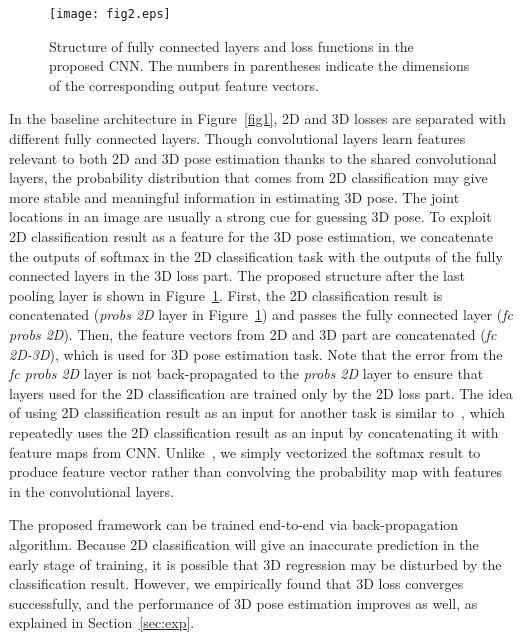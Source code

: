 \documentclass[runningheads]{llncs}
\begin{document}
\begin{figure}[t]
\centering
   \texttt{[image: fig2.eps]}
    \caption{Structure of fully connected layers and loss functions in the proposed CNN. The numbers in parentheses indicate the dimensions of the corresponding output feature vectors.}
    \label{fig2}
\end{figure}

In the baseline architecture in Figure~\ref{fig1}, 2D and 3D losses are separated with different fully connected layers. Though convolutional layers learn features relevant to both 2D and 3D pose estimation thanks to the shared convolutional layers, the probability distribution that comes from 2D classification may give more stable and meaningful information in estimating 3D pose. The joint locations in an image are usually a strong cue for guessing 3D pose. To exploit 2D classification result as a feature for the 3D pose estimation, we concatenate the outputs of softmax in the 2D classification task with the outputs of the fully connected layers in the 3D loss part. The proposed structure after the last pooling layer is shown in Figure~\ref{fig2}. First, the 2D classification result is concatenated (\textit{probs 2D} layer in Figure~\ref{fig2}) and passes the fully connected layer (\textit{fc probs 2D}). Then, the feature vectors from 2D and 3D part are concatenated (\textit{fc 2D-3D}), which is used for 3D pose estimation task. Note that the error from the \textit{fc probs 2D} layer is not back-propagated to the \textit{probs 2D} layer to ensure that layers used for the 2D classification are trained only by the 2D loss part. The idea of using 2D classification result as an input for another task is similar to~\cite{wei2016convolutional}, which repeatedly uses the 2D classification result as an input by concatenating it with feature maps from CNN. Unlike~\cite{wei2016convolutional}, we simply vectorized the softmax result to produce  feature vector rather than convolving the probability map with features in the convolutional layers.

The proposed framework can be trained end-to-end via back-propagation algorithm. Because 2D classification will give an inaccurate prediction in the early stage of training, it is possible that 3D regression may be disturbed by the classification result. However, we empirically found that 3D loss converges successfully, and the performance of 3D pose estimation improves as well, as explained in Section~\ref{sec:exp}.
\end{document}
